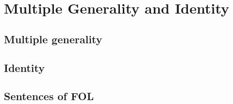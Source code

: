 
\section{Multiple Generality and Identity}

\subsection{Multiple generality} \cite[][Chapter 25, pp. 213-27]{Mag25}

\subsection{Identity} \cite[][Chapter 26, pp. 228-34]{Mag25}

\subsection{Sentences of FOL} \cite[][Chapter 27, pp.235-42]{Mag25}

